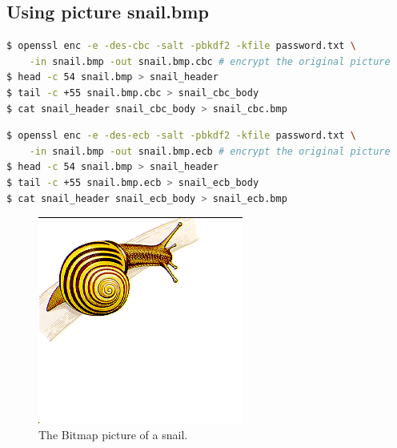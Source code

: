 \subsection{Using picture {\selectfont snail.bmp}}
%
\begin{lstlisting}[language=Bash, caption=Commands generating
    {\fontfamily{qcr}\selectfont snail\_cbc.bmp}, label={
        lst:snail_cbc
    }]
$ openssl enc -e -des-cbc -salt -pbkdf2 -kfile password.txt \
    -in snail.bmp -out snail.bmp.cbc # encrypt the original picture
$ head -c 54 snail.bmp > snail_header
$ tail -c +55 snail.bmp.cbc > snail_cbc_body
$ cat snail_header snail_cbc_body > snail_cbc.bmp
\end{lstlisting}

\begin{lstlisting}[language=Bash, caption=Commands generating
    {\fontfamily{qcr}\selectfont snail\_ecb.bmp}, label={
        lst:snail_ecb
    }]
$ openssl enc -e -des-ecb -salt -pbkdf2 -kfile password.txt \
    -in snail.bmp -out snail.bmp.ecb # encrypt the original picture
$ head -c 54 snail.bmp > snail_header
$ tail -c +55 snail.bmp.ecb > snail_ecb_body
$ cat snail_header snail_ecb_body > snail_ecb.bmp
\end{lstlisting}

\begin{figure}
    \centering
    \includegraphics[height=\textheight,width=\textwidth,keepaspectratio]
    {figures/snail.png}
    \caption{The Bitmap picture of a snail.}\label{fig:snail}
\end{figure}


